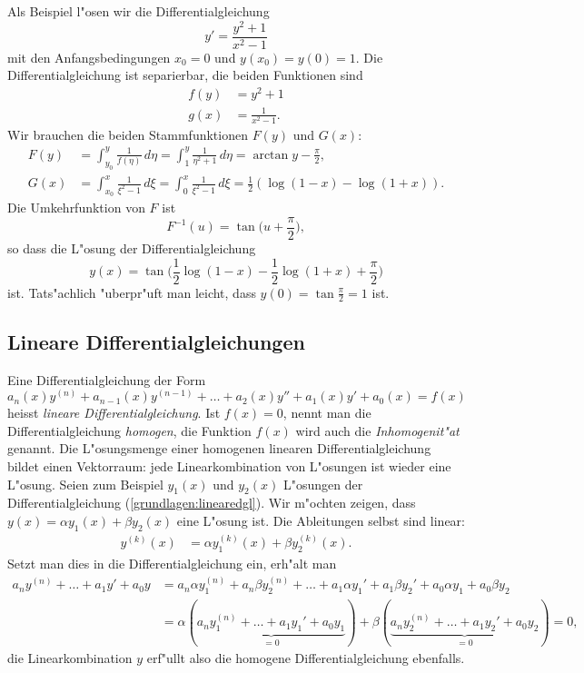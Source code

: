 \begin{beispiel}
Als Beispiel l"osen wir die Differentialgleichung
\[
y'=\frac{y^2+1}{x^2-1}
\]
mit den Anfangsbedingungen $x_0=0$ und $y(x_0)=y(0)=1$.
Die Differentialgleichung ist separierbar, die beiden Funktionen sind
\begin{align*}
f(y)&=y^2+1
\\
g(x)&=\frac1{x^2-1}.
\end{align*}
Wir brauchen die beiden Stammfunktionen $F(y)$ und $G(x)$:
\begin{align*}
F(y)
&=
\int_{y_0}^y \frac1{f(\eta)}\,d\eta
=
\int_{1}^y \frac1{\eta^2+1}\,d\eta
=
\arctan y - \frac{\pi}2,
\\
G(x)
&=
\int_{x_0}^x\frac1{\xi^2-1}\,d\xi
=
\int_0^x \frac1{\xi^2-1}\,d\xi
=
\frac12(\log(1-x)-\log(1+x)).
\end{align*}
Die Umkehrfunktion von $F$ ist
\[
F^{-1}(u)=\tan\biggl(u+\frac{\pi}2\biggr),
\]
so dass die L"osung der Differentialgleichung
\[
y(x)=
\tan\biggl(\frac12\log(1-x)-\frac12\log(1+x)+\frac{\pi}2\biggr)
\]
ist.
Tats"achlich "uberpr"uft man leicht, dass $y(0)=\tan\frac{\pi}2=1$ ist.
\end{beispiel}

\subsection{Lineare Differentialgleichungen}
Eine Differentialgleichung der Form
\begin{equation}
a_n(x)y^{(n)}+a_{n-1}(x)y^{(n-1)}+\dots+a_2(x)y''+a_1(x)y'+a_0(x)=f(x)
\label{grundlagen:linearedgl}
\end{equation}
heisst {\em lineare Differentialgleichung}.
Ist $f(x)=0$, nennt man die Differentialgleichung {\em homogen}, die
Funktion $f(x)$ wird auch die {\em Inhomogenit"at} genannt.
Die L"osungsmenge einer homogenen linearen Differentialgleichung
bildet einen Vektorraum: jede Linearkombination von L"osungen
ist wieder eine L"osung.
Seien zum Beispiel $y_1(x)$ und $y_2(x)$ L"osungen der Differentialgleichung
(\ref{grundlagen:linearedgl}).
Wir m"ochten zeigen, dass
$y(x)=\alpha y_1(x)+\beta y_2(x)$ eine L"osung ist.
Die Ableitungen selbst sind linear:
\begin{align*}
y^{(k)}(x)&=\alpha y_1^{(k)}(x)+\beta y_2^{(k)}(x).
\end{align*}
Setzt man dies in die Differentialgleichung ein, erh"alt man
\begin{align*}
a_ny^{(n)}+\dots+a_1y'+a_0y
&=
a_n\alpha y_1^{(n)}+a_n\beta y_2^{(n)}+\dots+a_1\alpha y_1'+a_1\beta y_2'
+ a_0\alpha y_1+a_0\beta y_2
\\
&=
\alpha(\underbrace{a_ny_1^{(n)}+\dots+a_1y_1'+a_0y_1}_{=0})
+
\beta(\underbrace{a_ny_2^{(n)}+\dots+a_1y_2'+a_0y_2}_{=0})=0,
\end{align*}
die Linearkombination $y$ erf"ullt also die homogene Differentialgleichung
ebenfalls.

